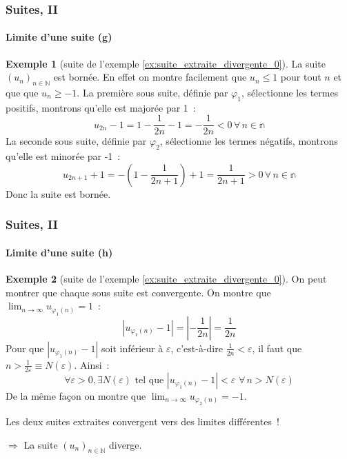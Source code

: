 \documentclass[10pt,notheorems]{beamer}
\theoremstyle{plain}
\theoremstyle{definition} %
\newtheorem{example}{Exemple}
\begin{document}
\begin{frame}
  \frametitle{Suites, II}
  \framesubtitle{Limite d'une suite (g)}
  \hypertarget{slide_suite_limite_7}{}

  \bigskip

  \begin{example}[suite de l'exemple \hyperlink{slide_suites_extraites}{\ref{ex:suite_extraite_divergente_0}}]
    La suite $(u_n)_{n\in\mathbb N}$ est bornée. En effet on montre
    facilement que $u_n\leq 1$ pour tout $n$ et que que $u_n \geq
    -1$. La première sous suite, définie par $\varphi_1$, sélectionne les
    termes positifs, montrons qu'elle est majorée par 1~:
    \[
      u_{2n}-1 = 1-\frac{1}{2n}-1 = -\frac{1}{2n} < 0 \,\forall\, n\in\mathbb n
    \]
    La seconde sous suite, définie par $\varphi_2$, sélectionne les
    termes négatifs, montrons qu'elle est minorée par -1~:
    \[
      u_{2n+1}+1 = -\left(1-\frac{1}{2n+1}\right)+1 = \frac{1}{2n+1} > 0 \,\forall\, n\in\mathbb n
    \]
    Donc la suite est bornée.
  \end{example}

\end{frame}


\begin{frame}
  \frametitle{Suites, II}
  \framesubtitle{Limite d'une suite (h)}
  \hypertarget{slide_suite_limite_8}{}

  \bigskip

  \addtocounter{example}{-1}
  \begin{example}[suite de l'exemple \hyperlink{slide_suites_extraites}{\ref{ex:suite_extraite_divergente_0}}]
    On peut montrer que chaque sous suite est convergente. On montre
    que $\lim_{n\rightarrow\infty}u_{\varphi_1(n)} = 1$~:
    \[
      |u_{\varphi_1(n)}-1| = \left|-\frac{1}{2n}\right| = \frac{1}{2n}
    \]
    Pour que $|u_{\varphi_1(n)}-1|$ soit inférieur à $\varepsilon$,
    c'est-à-dire $\frac{1}{2n}<\varepsilon$, il faut que $n>\frac{1}{2\varepsilon}\equiv N(\varepsilon)$. Ainsi~:
    \[
      \forall \varepsilon>0, \exists N(\varepsilon) \text{ tel que } |u_{\varphi_1(n)}-1|<\varepsilon\,\, \forall \, n>N(\varepsilon)
    \]
    De la même façon on montre que $\lim_{n\rightarrow\infty}u_{\varphi_2(n)} = -1$.\newline

    \textdbend Les deux suites extraites convergent vers des limites différentes !
    \begin{center}
      $\Rightarrow$ La suite $(u_n)_{n\in\mathbb N}$ diverge.
    \end{center}

  \end{example}

\end{frame}
\end{document}
